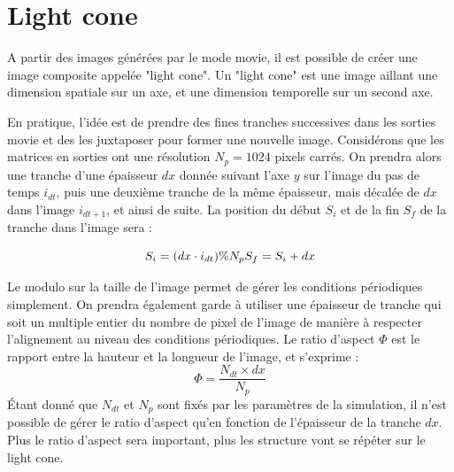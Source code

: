 \section{Light cone}

A partir des images générées par le mode movie, il est possible de créer une image composite appelée "light cone".
Un "light cone" est une image aillant une dimension spatiale sur un axe, et une dimension temporelle sur un second axe.


En pratique, l'idée est de prendre des fines tranches successives dans les sorties movie et des les juxtaposer pour former une nouvelle image.
Considérons que les matrices en sorties ont une résolution $N_p=1024$ pixels carrés.
On prendra alors une tranche d'une épaisseur $dx$ donnée suivant l'axe $y$ sur l'image du pas de temps $i_{dt}$, puis une deuxième tranche de la même épaisseur, mais décalée de $dx$ dans l'image $i_{dt+1}$, et ainsi de suite.
La position du début $S_i$ et de la fin $S_f$ de la tranche dans l'image sera :

\begin{equation}
S_i = (dx \cdot i_{dt}) \% N_p \\
S_f = S_i + dx 
\end{equation} 

Le modulo sur la taille de l'image permet de gérer les conditions périodiques simplement.
On prendra également garde à utiliser une épaisseur de tranche qui soit un multiple entier du nombre de pixel de l'image de manière à respecter l’alignement au niveau des conditions périodiques.
Le ratio d'aspect $\Phi$ est le rapport entre la hauteur et la longueur de l'image, et s'exprime :
\begin{equation}
\Phi = \frac{ N_{dt} \times dx}{N_p}
\end{equation}
Étant donné que $N_{dt}$ et $N_p$ sont fixés par les paramètres de la simulation, il n'est possible de gérer le ratio d'aspect qu'en fonction de l'épaisseur de la tranche $dx$.
Plus le ratio d'aspect sera important, plus les structure vont se répéter sur le light cone.

